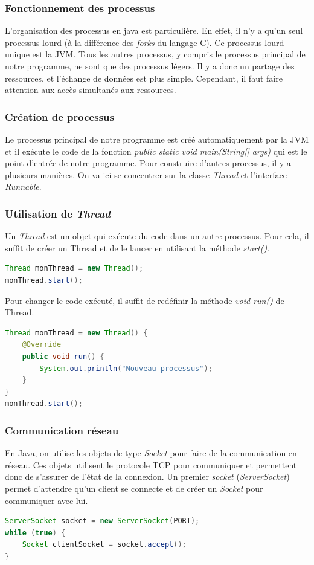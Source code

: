 \subsubsection{Fonctionnement des processus}
L'organisation des processus en java est particulière. En effet, il n'y a qu'un seul processus lourd (à la différence des \emph{forks} du langage C).
Ce processus lourd unique est la JVM. Tous les autres processus, y compris le processus principal de notre programme, ne sont que des processus légers.
Il y a donc un partage des ressources, et l'échange de données est plus simple. Cependant, il faut faire attention aux accès simultanés aux ressources.
\subsubsection{Création de processus}
Le processus principal de notre programme est créé automatiquement par la JVM et il exécute le code de la fonction \emph{public static void main(String[] args)} qui est le point d'entrée de notre programme.
Pour construire d'autres processus, il y a plusieurs manières. On va ici se concentrer sur la classe \emph{Thread} et l'interface \emph{Runnable}.
\subsubsection{Utilisation de \emph{Thread}}
Un \emph{Thread} est un objet qui exécute du code dans un autre processus. Pour cela, il suffit de créer un Thread et de le lancer en utilisant la méthode \emph{start()}.
\begin{lstlisting}[language=Java]
Thread monThread = new Thread();
monThread.start();
\end{lstlisting}

Pour changer le code exécuté, il suffit de redéfinir la méthode \emph{void run()} de Thread.
\begin{lstlisting}[language=Java]
Thread monThread = new Thread() {
	@Override
	public void run() {
		System.out.println("Nouveau processus");
	}
}
monThread.start();
\end{lstlisting}

\subsubsection{Communication réseau}
En Java, on utilise les objets de type \emph{Socket} pour faire de la communication en réseau. Ces objets utilisent le protocole TCP pour communiquer et permettent donc de s'assurer de l'état de la connexion.
Un premier \emph{socket} (\emph{ServerSocket}) permet d'attendre qu'un client se connecte et de créer un \emph{Socket} pour communiquer avec lui.
\begin{lstlisting}[language=Java]
ServerSocket socket = new ServerSocket(PORT);
while (true) {
	Socket clientSocket = socket.accept();
}
\end{lstlisting}

